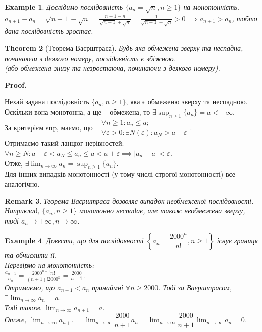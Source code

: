 \documentclass[a4paper, 14pt]{article}
\makeatletter
\def\qed{$\blacksquare$}
\theoremstyle{theoremdd}
\newtheorem{theorem}{Theorem}[subsection]
\theoremstyle{theoremdd}
\theoremstyle{theoremdd}
\theoremstyle{theoremdd}
\newtheorem{example}[theorem]{Example}
\theoremstyle{theoremdd}
\theoremstyle{theoremdd}
\newtheorem{remark}[theorem]{Remark}
\theoremstyle{theoremdd}
\theoremstyle{theoremdd}
\renewenvironment{proof}[1][Proof.\\]{\par
\pushQED{\hfill \qed}%
\normalfont \topsep6\p@\@plus6\p@\relax
\trivlist
\item\relax
{\bfseries
#1\@addpunct{.}}\hspace\labelsep\ignorespaces
}{%
\popQED\endtrivlist\@endpefalse
}
\makeatother
\begin{document}
	\begin{example}
	Дослідимо послідовність $\{a_n = \sqrt{n}, n \geq 1 \}$ на монотонність.\\
	$\displaystyle a_{n+1} - a_n = \sqrt{n+1} - \sqrt{n} = \frac{n+1-n}{\sqrt{n+1} + \sqrt{n}} = \frac{1}{\sqrt{n+1} + \sqrt{n}} > 0 \implies a_{n+1}>a_n$, тобто дана послідовність зростає.
	\end{example}
	
	\begin{theorem}[Теорема Ваєрштраса]
	Будь-яка обмежена зверху та неспадна, починаючи з деякого номеру, послідовність є збіжною.\\
	(або обмежена знизу та незростаюча, починаючи з деякого номеру).
	\end{theorem}

	\begin{proof}
	Нехай задана послідовність $\{a_n, n \geq 1\}$, яка є обмеженю зверху та неспадною. Оскільки вона монотонна, а ще -- обмежена, то $\exists \displaystyle\sup_{n \geq 1}\{a_n\} = a < +\infty$.\\
	За критерієм sup, маємо, що \ $ \begin{gathered}
	\forall n \geq 1: a_n \leq a ;\\
	\forall \varepsilon > 0: \exists N(\varepsilon): a_{N} > a - \varepsilon
	\end{gathered}$.\\
	Отримаємо такий ланцюг нерівностей: $\forall n \geq N: a-\varepsilon < a_N \leq a_n \leq a < a + \varepsilon \implies |a_n-a|<\varepsilon$.\\
	Отже, $\displaystyle \exists \lim_{n \to \infty} a_n = \sup_{n \geq 1}\{a_n\}$.
	\bigskip \\
	Для інших випадків монотонності (у тому числі строгої монотонності) все аналогічно.
	\end{proof}
	
	\begin{remark}
	Теорема Ваєрштраса дозволяє випадок необмеженої послідовності.\\
	Наприклад, $\{a_n, n \geq 1\}$ монотонно неспадає, але також необмежена зверху, тоді $a_n \to +\infty, n \to \infty$.
	\end{remark}
	
	\begin{example}
	Довести, що для послідовності $\left\{ a_n = \dfrac{2000^n}{n!}, n \geq 1 \right\}$ існує границя та обчислити її.\\
	Перевірмо на монотонність:\\
	$\displaystyle \frac{a_{n+1}}{a_n} = \frac{2000^{n+1} n!}{(n+1)! 2000^n} = \frac{2000}{n+1}$.\\
	Отримаємо, що $a_{n+1} < a_n$ принаймні $\forall n \geq 2000$. Тоді за Ваєрштрасом, $\exists \displaystyle \lim_{n \to \infty} a_n = a$.\\
	Тоді також $\displaystyle \lim_{n \to \infty} a_{n+1} = a$.\\
	Отже, $\displaystyle \lim_{n \to \infty} a_{n+1} = \lim_{n \to \infty} \dfrac{2000}{n+1} a_n = \lim_{n \to \infty} \dfrac{2000}{n+1} \lim_{n \to \infty} a_n = 0$.
	\end{example}
	
\end{document}

